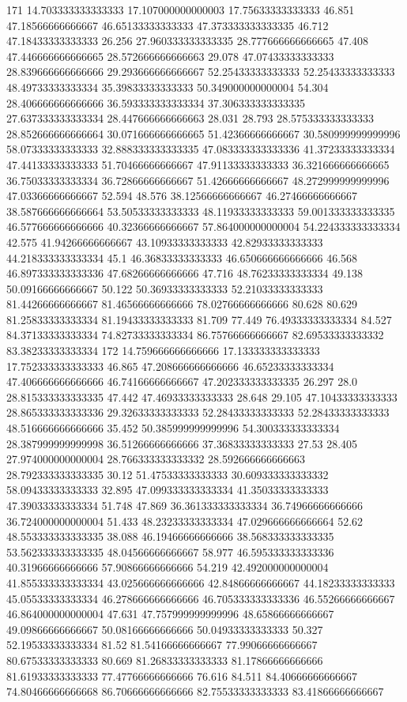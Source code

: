 171 14.703333333333333 17.107000000000003 17.75633333333333 46.851 47.18566666666667 46.65133333333333 47.373333333333335 46.712 47.18433333333333 26.256 27.960333333333335 28.777666666666665 47.408 47.446666666666665 28.572666666666663 29.078 47.07433333333333 28.839666666666666 29.293666666666667 52.25433333333333 52.25433333333333 48.49733333333334 35.39833333333333 50.349000000000004 54.304 28.406666666666666 36.593333333333334 37.306333333333335 27.637333333333334 28.447666666666663 28.031 28.793 28.575333333333333 28.852666666666664 30.071666666666665 51.42366666666667 30.580999999999996 58.07333333333333 32.888333333333335 47.083333333333336 41.37233333333334 47.44133333333333 51.70466666666667 47.91133333333333 36.321666666666665 36.75033333333334 36.72866666666667 51.42666666666667 48.272999999999996 47.03366666666667 52.594 48.576 38.12566666666667 46.27466666666667 38.587666666666664 53.50533333333333 48.11933333333333 59.001333333333335 46.577666666666666 40.32366666666667 57.864000000000004 54.224333333333334 42.575 41.94266666666667 43.10933333333333 42.82933333333333 44.218333333333334 45.1 46.36833333333333 46.650666666666666 46.568 46.897333333333336 47.68266666666666 47.716 48.76233333333334 49.138 50.09166666666667 50.122 50.36933333333333 52.21033333333333 81.44266666666667 81.46566666666666 78.02766666666666 80.628 80.629 81.25833333333334 81.19433333333333 81.709 77.449 76.49333333333334 84.527 84.37133333333334 74.82733333333334 86.75766666666667 82.69533333333332 83.38233333333334
172 14.759666666666666 17.133333333333333 17.752333333333333 46.865 47.208666666666666 46.65233333333334 47.406666666666666 46.74166666666667 47.202333333333335 26.297 28.0 28.815333333333335 47.442 47.46933333333333 28.648 29.105 47.10433333333333 28.865333333333336 29.32633333333333 52.28433333333333 52.28433333333333 48.516666666666666 35.452 50.385999999999996 54.300333333333334 28.387999999999998 36.51266666666666 37.36833333333333 27.53 28.405 27.974000000000004 28.766333333333332 28.592666666666663 28.792333333333335 30.12 51.47533333333333 30.609333333333332 58.09433333333333 32.895 47.099333333333334 41.35033333333333 47.39033333333334 51.748 47.869 36.361333333333334 36.74966666666666 36.724000000000004 51.433 48.23233333333334 47.029666666666664 52.62 48.553333333333335 38.088 46.19466666666666 38.568333333333335 53.562333333333335 48.04566666666667 58.977 46.595333333333336 40.31966666666666 57.90866666666666 54.219 42.492000000000004 41.855333333333334 43.025666666666666 42.84866666666667 44.18233333333333 45.05533333333334 46.278666666666666 46.705333333333336 46.55266666666667 46.864000000000004 47.631 47.757999999999996 48.65866666666667 49.09866666666667 50.08166666666666 50.04933333333333 50.327 52.19533333333334 81.52 81.54166666666667 77.99066666666667 80.67533333333333 80.669 81.26833333333333 81.17866666666666 81.61933333333333 77.47766666666666 76.616 84.511 84.40666666666667 74.80466666666668 86.70666666666666 82.75533333333333 83.41866666666667
